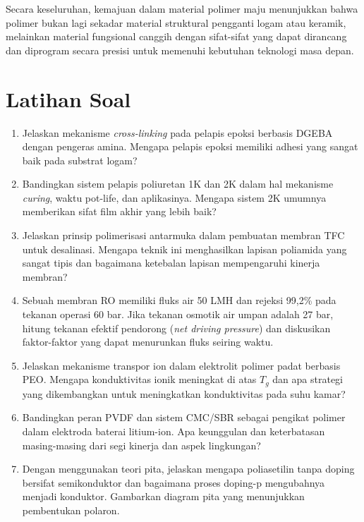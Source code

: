 \documentclass[12pt,a4paper,openany]{book}
\begin{document}
Secara keseluruhan, kemajuan dalam material polimer maju menunjukkan bahwa polimer bukan lagi sekadar material struktural pengganti logam atau keramik, melainkan material fungsional canggih dengan sifat-sifat yang dapat dirancang dan diprogram secara presisi untuk memenuhi kebutuhan teknologi masa depan.

\section{Latihan Soal}

\begin{enumerate}

\item Jelaskan mekanisme \textit{cross-linking} pada pelapis epoksi berbasis DGEBA dengan pengeras amina. Mengapa pelapis epoksi memiliki adhesi yang sangat baik pada substrat logam?

\item Bandingkan sistem pelapis poliuretan 1K dan 2K dalam hal mekanisme \textit{curing}, waktu pot-life, dan aplikasinya. Mengapa sistem 2K umumnya memberikan sifat film akhir yang lebih baik?

\item Jelaskan prinsip polimerisasi antarmuka dalam pembuatan membran TFC untuk desalinasi. Mengapa teknik ini menghasilkan lapisan poliamida yang sangat tipis dan bagaimana ketebalan lapisan mempengaruhi kinerja membran?

\item Sebuah membran RO memiliki fluks air 50 LMH dan rejeksi  99,2\% pada tekanan operasi 60 bar. Jika tekanan osmotik air umpan adalah 27 bar, hitung tekanan efektif pendorong (\textit{net driving pressure}) dan diskusikan faktor-faktor yang dapat menurunkan fluks seiring waktu.

\item Jelaskan mekanisme transpor ion  dalam elektrolit polimer padat berbasis PEO. Mengapa konduktivitas ionik meningkat di atas $T_g$ dan apa strategi yang dikembangkan untuk meningkatkan konduktivitas pada suhu kamar?

\item Bandingkan peran PVDF dan sistem CMC/SBR sebagai pengikat polimer dalam elektroda baterai litium-ion. Apa keunggulan dan keterbatasan masing-masing dari segi kinerja dan aspek lingkungan?

\item Dengan menggunakan teori pita, jelaskan mengapa poliasetilin tanpa doping bersifat semikonduktor dan bagaimana proses doping-p mengubahnya menjadi konduktor. Gambarkan diagram pita yang menunjukkan pembentukan polaron.


\end{enumerate}
\end{document}
